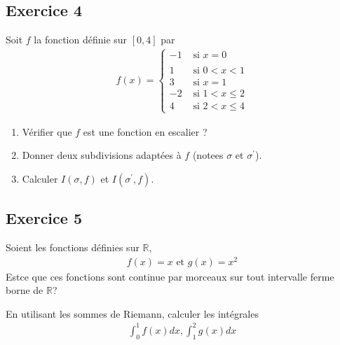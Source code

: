 \documentclass[letterpaper,10pt,french]{sphinxmanual}
\begin{document}
\subsection{Exercice 4}
\label{\detokenize{exo1:exercice-4}}
\sphinxAtStartPar
Soit \(f\) la fonction définie sur \([0, 4]\) par
\begin{equation*}
\begin{split}
f(x) =
\begin{cases}
-1& \mbox{ si } x=0 \\ \\ 
1 & \mbox{ si } 0<x<1 \\
3 & \mbox{ si } x=1 \\
-2&  \mbox{ si } 1< x \leq 2 \\
4 & \mbox{ si } 2< x \leq 4
\end{cases}
\end{split}
\end{equation*}\begin{enumerate}
%
\item {} 
\sphinxAtStartPar
Vérifier que \(f\) est une fonction en escalier ?

\item {} 
\sphinxAtStartPar
Donner deux subdivisions adaptées à \(f\) (notees \(\sigma\) et \(\sigma^{'}\)).

\item {} 
\sphinxAtStartPar
Calculer \(I(\sigma, f)\) et \(I(\sigma^{'}, f)\).

\end{enumerate}


\subsection{Exercice 5}
\label{\detokenize{exo1:exercice-5}}
\sphinxAtStartPar
Soient les fonctions définies sur \(\mathbb R\),
\begin{equation*}
\begin{split}
f(x)=x \mbox{ et } g(x)= x^2
\end{split}
\end{equation*}
\sphinxAtStartPar
Est\sphinxhyphen{}ce que ces fonctions sont continue par morceaux sur tout intervalle ferme borne de \(\mathbb R\)?

\sphinxAtStartPar
En utilisant les sommes de Riemann, calculer les intégrales
\begin{equation*}
\begin{split}
\int_0^1 f(x)dx, \int_1^2 g(x)dx
\end{split}
\end{equation*}
\end{document}
